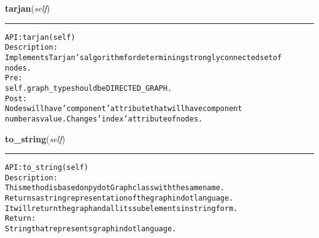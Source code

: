     \label{coinor:gimpy:graph:Graph:tarjan}

    \vspace{0.5ex}

\hspace{.8\funcindent}\begin{boxedminipage}{\funcwidth}

    \raggedright \textbf{tarjan}(\textit{self})

    \vspace{-1.5ex}

    \rule{\textwidth}{0.5\fboxrule}
\setlength{\parskip}{2ex}
\begin{alltt}

API: tarjan(self)
Description:
Implements Tarjan's algorithm for determining strongly connected set of
nodes.
Pre:
    self.graph\_type should be DIRECTED\_GRAPH.
Post:
    Nodes will have 'component' attribute that will have component
    number as value. Changes 'index' attribute of nodes.
\end{alltt}

\setlength{\parskip}{1ex}
    \end{boxedminipage}

    \label{coinor:gimpy:graph:Graph:to_string}

    \vspace{0.5ex}

\hspace{.8\funcindent}\begin{boxedminipage}{\funcwidth}

    \raggedright \textbf{to\_string}(\textit{self})

    \vspace{-1.5ex}

    \rule{\textwidth}{0.5\fboxrule}
\setlength{\parskip}{2ex}
\begin{alltt}

API: to\_string(self)
Description:
This method is based on pydot Graph class with the same name.
Returns a string representation of the graph in dot language.
It will return the graph and all its subelements in string form.
Return:
    String that represents graph in dot language.
\end{alltt}

\setlength{\parskip}{1ex}
    \end{boxedminipage}

